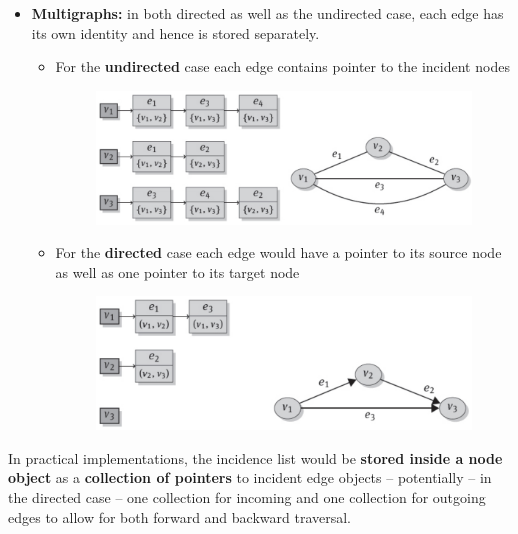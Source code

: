 \begin{itemize}
    \item \textbf{Multigraphs:} in both directed as well as the undirected case, each edge has its own identity and hence is stored separately.
    \begin{itemize}
        \item For the \textbf{undirected} case each edge contains pointer to the incident nodes
        \begin{figure}[!h]
        \centering
        \includegraphics[width=0.7\linewidth]{images/AdvancedDataManagment/graph_databases/inc_list_multi_undirected.jpeg}
        \end{figure}
        \newpage
        \item For the \textbf{directed} case each edge would have a pointer to its source node as well as one pointer to its target node
        \begin{figure}[!h]
        \centering
        \includegraphics[width=0.7\linewidth]{images/AdvancedDataManagment/graph_databases/inc_list_multi_directed.jpeg}
        \end{figure}
    \end{itemize}
\end{itemize}
In practical implementations, the incidence list would be \textbf{stored inside a node object} as a \textbf{collection of pointers} to incident edge objects – potentially – in the directed case – one collection for incoming and one collection for outgoing edges to allow for both forward and backward traversal.

